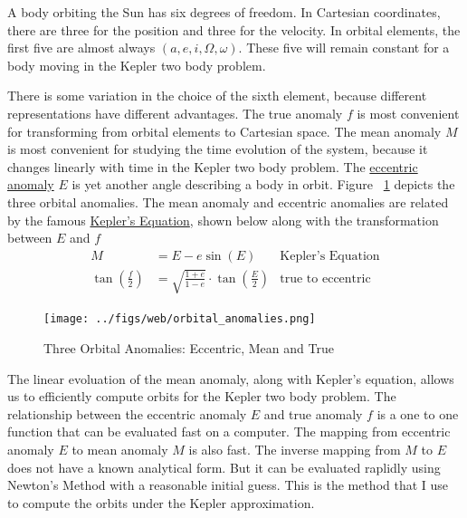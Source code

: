 A body orbiting the Sun has six degrees of freedom.  
In Cartesian coordinates, there are three for the position and three for the velocity.
In orbital elements, the first five are almost always $(a, e, i, \Omega, \omega)$.
These five will remain constant for a body moving in the Kepler two body problem.

There is some variation in the choice of the sixth element, because different representations have different advantages.
The true anomaly $f$ is most convenient for transforming from orbital elements to Cartesian space.
The mean anomaly $M$ is most convenient for studying the time evolution of the system, because it changes linearly with time in the Kepler two body problem.
The \href{https://en.wikipedia.org/wiki/Eccentric_anomaly}{eccentric anomaly} $E$ is yet another angle describing a body in orbit.
Figure ~\ref{fig:OrbitalAnomalies} depicts the three orbital anomalies.
The mean anomaly and eccentric anomalies are related by the famous 
\href{https://en.wikipedia.org/wiki/Kepler\%27s_equation}{Kepler's Equation},
shown below along with the transformation between $E$ and $f$
\begin{align*}
M &= E - e \sin(E) & \textrm{Kepler's Equation} \\
\tan \left(\frac{f}{2} \right) &= \sqrt{\frac{1+e}{1-e}} \cdot \tan \left( \frac{E}{2} \right) &\textrm{true to eccentric}
\end{align*}

\begin{figure}
\begin{center}
\texttt{[image: ../figs/web/orbital\_anomalies.png]}
\end{center}
\caption[Three Orbital Anomalies: Eccentric ($E$), Mean ($M$) and True ($f$)]
{Three Orbital Anomalies: Eccentric, Mean and True}
\label{fig:OrbitalAnomalies}
\end{figure}
 
The linear evoluation of the mean anomaly, along with Kepler's equation, allows us to efficiently compute orbits for the Kepler two body problem.
The relationship between the eccentric anomaly $E$ and true anomaly $f$ is a one to one function that can be evaluated fast on a computer.
The mapping from eccentric anomaly $E$ to mean anomaly $M$ is also fast.
The inverse mapping from $M$ to $E$ does not have a known analytical form.
But it can be evaluated raplidly using Newton's Method with a reasonable initial guess.
This is the method that I use to compute the orbits under the Kepler approximation. 

